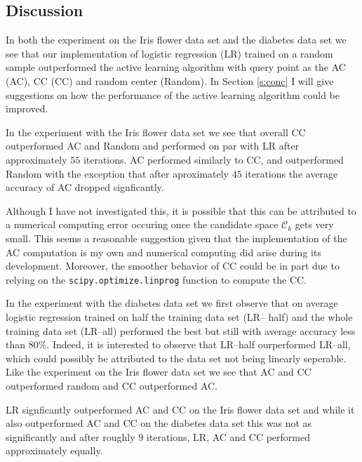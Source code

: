 \documentclass[11pt]{amsart}
\theoremstyle{definition}
\theoremstyle{remark}
\begin{document}

    \subsection*{Discussion}
        In both the experiment on the Iris flower data set and the diabetes data set we see that our implementation of logistic regression (LR) trained on a random sample outperformed the active learning algorithm with query point as the AC (AC), CC (CC) and random center (Random). In Section \ref{s:conc} I will give suggestions on how the performance of the active learning algorithm could be improved.

        In the experiment with the Iris flower data set we see that overall CC outperformed AC and Random and performed on par with LR after approximately $55$ iterations. AC performed similarly to CC, and outperformed Random with the exception that after aproximately $45$ iterations the average accuracy of AC dropped signficantly. 

        Although I have not investigated this, it is possible that this can be attributed to a numerical computing error occuring once the candidate space $\mathcal{C}_k$ gets very small. This seems a reasonable suggestion given that the implementation of the AC computation is my own and numerical computing did arise during its development. Moreover, the smoother behavior of CC could be in part due to relying on the \texttt{scipy.optimize.linprog} function to compute the CC. 

        In the experiment with the diabetes data set we first observe that on average logistic regression trained on half the training data set (LR-- half) and the whole training data set (LR--all) performed the best but still with average accuracy less than 80\%. Indeed, it is interested to observe that LR--half ourperformed LR--all, which could possibly be attributed to the data set not being linearly seperable. Like the experiment on the Iris flower data set we see that AC and CC outperformed random and CC outperformed AC.

        LR signficantly outperformed AC and CC on the Iris flower data set and while it also outperformed AC and CC on the diabetes data set this was not as significantly and after roughly $9$ iterations, LR, AC and CC performed approximately equally. 
\end{document}
